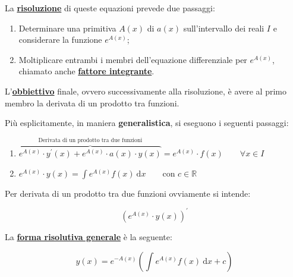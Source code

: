 \documentclass[a4paper]{article}
\begin{document}
	\noindent
	La \textbf{\underline{risoluzione}} di queste equazioni prevede due passaggi:
	
	\begin{enumerate}
		\item Determinare una primitiva $A\left(x\right)$ di $a\left(x\right)$ sull'intervallo dei reali $I$ e considerare la funzione $e^{A\left(x\right)}$;
		
		\item Moltiplicare entrambi i membri dell'equazione differenziale per $e^{A\left(x\right)}$, chiamato anche \textcolor{Red3}{\textbf{\underline{fattore integrante}}}.
	\end{enumerate}

	\noindent
	L'\textcolor{Red3}{\textbf{\underline{obbiettivo}}} finale, ovvero successivamente alla risoluzione, è avere al primo membro la derivata di un prodotto tra funzioni.\newline
	
	\noindent
	Più esplicitamente, in maniera \textbf{generalistica}, si eseguono i seguenti passaggi:
	
	\begin{enumerate}
		\item $\overbrace{e^{A\left(x\right)} \cdot y^{'}\left(x\right) + e^{A\left(x\right)} \cdot a\left(x\right) \cdot y\left(x\right)}^{\text{Derivata di un prodotto tra due funzioni}} = e^{A\left(x\right)} \cdot f\left(x\right) \hspace{2em} \forall x \in I$

		\item $e^{A\left(x\right)} \cdot y\left(x\right) = \int e^{A\left(x\right)} f\left(x\right) \: \mathrm{d}x \hspace{2em} \text{con } c \in \mathbb{R}$
	\end{enumerate}

	\noindent
	Per derivata di un prodotto tra due funzioni ovviamente si intende:
	
	\begin{equation*}
		\left(e^{A\left(x\right)} \cdot y\left(x\right)\right)^{'}
	\end{equation*}

	La \textcolor{Red3}{\textbf{\underline{forma risolutiva generale}}} è la seguente:
	
	\begin{equation*}
		y\left(x\right) = e^{-A\left(x\right)} \left(\int e^{A\left(x\right)} f\left(x\right) \: \mathrm{d}x + c\right)
	\end{equation*}
\end{document}
